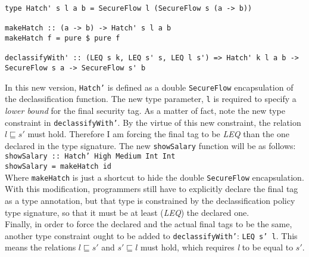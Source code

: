 \begin{lstlisting}[caption={A more strict Hatch version}, label={lst:newhatch}, breaklines=true]
type Hatch' s l a b = SecureFlow l (SecureFlow s (a -> b))

makeHatch :: (a -> b) -> Hatch' s l a b
makeHatch f = pure $ pure f

declassifyWith' :: (LEQ s k, LEQ s' s, LEQ l s') => Hatch' k l a b -> SecureFlow s a -> SecureFlow s' b
\end{lstlisting}
In this new version, \texttt{Hatch'} is defined as a double \texttt{SecureFlow} encapsulation of the declassification function. The new type parameter, \texttt{l} is required to specify a \textit{lower bound} for the final security tag. As a matter of fact, note the new type constraint in \texttt{declassifyWith'}. By the virtue of this new constraint, the relation $l \sqsubseteq s'$ must hold. Therefore I am forcing the final tag to be \textit{LEQ} than the one declared in the type signature. The new \texttt{showSalary} function will be as follows: \\
\texttt{showSalary :: Hatch' High Medium Int Int \\showSalary = makeHatch id} \\
Where \texttt{makeHatch} is just a shortcut to hide the double \texttt{SecureFlow} encapsulation. \\
With this modification, programmers still have to explicitly declare the final tag as a type annotation, but that type is constrained by the declassification policy type signature, so that it must be at least (\textit{LEQ}) the declared one. \\
Finally, in order to force the declared and the actual final tags to be the same, another type constraint ought to be added to \texttt{declassifyWith'}: \texttt{LEQ s' l}. This means the relations $l \sqsubseteq s'$ and $s' \sqsubseteq l$ must hold, which requires \textit{l} to be equal to $s'$.